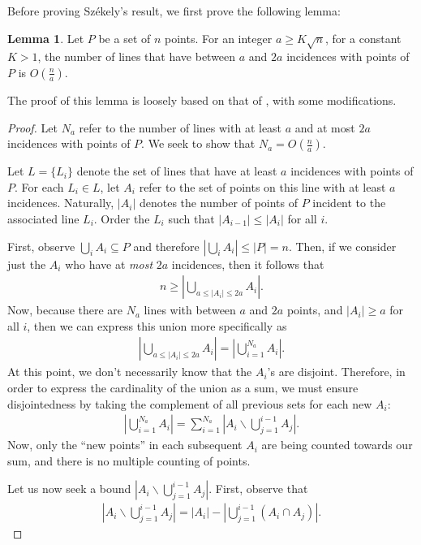 \documentclass{scrippsthesisclass}
\theoremstyle{definition}
\newtheorem{lemma}[theorem]{Lemma}
\begin{document}
Before proving Sz\'{e}kely's result, we first prove the following lemma:
\begin{lemma}
    Let $P$ be a set of $n$ points. 
    For an integer $a \geq K\sqrt{n}$, for a constant $K > 1$, the number of lines that have between $a$ and $2a$ incidences with points of $P$ is $O\left(\frac{n}{a}\right)$. 
\end{lemma}
The proof of this lemma is loosely based on that of \cite{thebook}, with some modifications. 
\begin{proof}
    Let $N_a$ refer to the number of lines with at least $a$ and at most $2a$ incidences with points of $P$. 
    We seek to show that $N_a = O\left(\frac{n}{a}\right)$. 
    
    Let $L = \{L_i\}$ denote the set of lines that have at least $a$ incidences with points of $P$. 
    For each $L_i \in L$, let $A_i$ refer to the set of points on this line with at least $a$ incidences.
    Naturally, $|A_i|$ denotes the number of points of $P$ incident to the associated line $L_i$.
    Order the $L_i$ such that $|A_{i - 1}| \leq |A_i|$ for all $i$. 

    First, observe $\bigcup_i A_i \subseteq P$ and therefore $\left| \bigcup_i A_i \right| \leq |P| = n$.
    Then, if we consider just the $A_i$ who have at \textit{most} $2a$ incidences, then it follows that
    \begin{align}
    n \geq \left| \bigcup_{a \leq |A_i| \leq 2a} A_i \right|.
    \end{align}
    Now, because there are $N_a$ lines with between $a$ and $2a$ points, and $|A_i| \geq a$ for all $i$, then we can express this union more specifically as 
    \begin{align}
    \left| \bigcup_{a \leq |A_i| \leq 2a} A_i \right| = \left| \bigcup_{i=1}^{N_a} A_i \right|.
    \end{align}
    At this point, we don't necessarily know that the $A_i$'s are disjoint.
    Therefore, in order to express the cardinality of the union as a sum, we must ensure disjointedness by taking the complement of all previous sets for each new $A_i$: 
    \begin{align}
    \left| \bigcup_{i=1}^{N_a} A_i \right| = \sum_{i=1}^{N_a} \left|A_i \backslash \bigcup_{j=1}^{i-1} A_j \right|.
    \end{align}
    Now, only the ``new points'' in each subsequent $A_i$ are being counted towards our sum, and there is no multiple counting of points. 

    Let us now seek a bound $\left|A_i \backslash \bigcup_{j=1}^{i-1} A_j \right|$. 
    First, observe that 
    \begin{align}
        \left|A_i \backslash \bigcup_{j=1}^{i-1} A_j \right| = \left|A_i\right| - \left|\bigcup_{j=1}^{i-1} (A_i \cap A_j)\right|.
    \end{align}


\end{proof}
\end{document}
